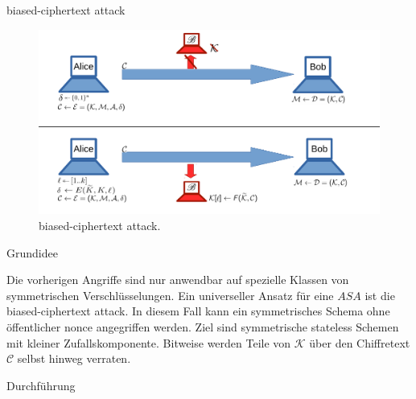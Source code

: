 \begin{section}{biased-ciphertext attack}
\label{sec:biased_ciphertext}

\begin{figure}[!ht]
	\centering
	\includegraphics[width=\textwidth]{image/biased_ciphertext}
	\caption{biased-ciphertext attack.}
	\label{fig:biased_ciphertext}
\end{figure}


\begin{subsection}{Grundidee}

Die vorherigen Angriffe sind nur anwendbar auf spezielle Klassen von symmetrischen Verschlüsselungen. Ein universeller Ansatz für eine $ASA$ ist die biased-ciphertext attack. In diesem Fall kann ein symmetrisches Schema ohne öffentlicher nonce angegriffen werden. Ziel sind symmetrische stateless Schemen mit kleiner Zufallskomponente. Bitweise werden Teile von $\mathcal{K}$ über den Chiffretext $\mathcal{C}$ selbst hinweg verraten.

\end{subsection}

\begin{subsection}{Durchführung}


\end{subsection}
\end{section}
